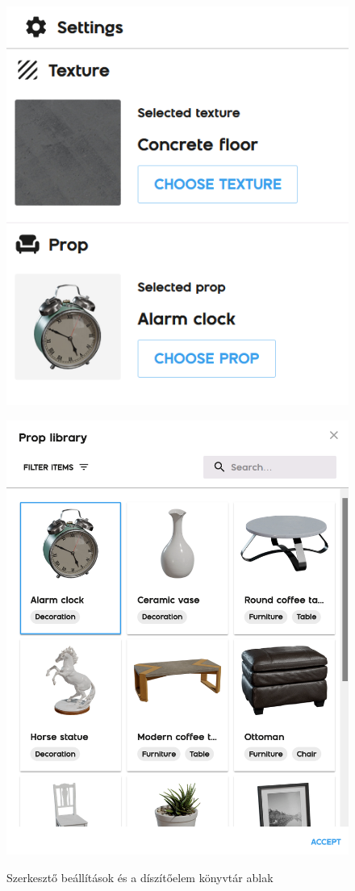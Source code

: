 \begin{figure}[h]
  \centering
  \begin{minipage}{.5\textwidth}
    \centering
    \includegraphics[width=.6\linewidth]{parts/developer-documentation/frontend/images/editorSettings.png}
    \label{fig:editorSettings}
  \end{minipage}%
  \begin{minipage}{.5\textwidth}
    \centering
    \includegraphics[width=.6\linewidth]{parts/developer-documentation/frontend/images/library.png}
    \label{fig:library}
  \end{minipage}
  \caption{Szerkesztő beállítások és a díszítőelem könyvtár ablak}
\end{figure}

